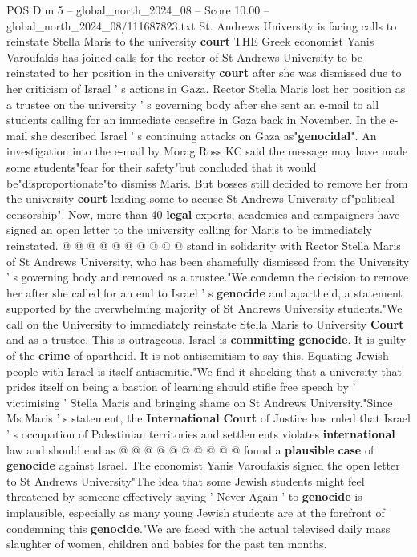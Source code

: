 \begin{textsample}{POS Dim 5 – global\_north\_2024\_08 – Score 10.00 – global\_north\_2024\_08/111687823.txt}  \label{ex:f5_pos_379}
St.
Andrews University is facing calls to reinstate Stella Maris to the university \textbf{court} THE Greek economist Yanis Varoufakis has joined calls for the rector of St Andrews University to be reinstated to her position in the university \textbf{court} after she was dismissed due to her criticism of Israel ' s actions in Gaza.
Rector Stella Maris lost her position as a trustee on the university ' s governing body after she sent an e-mail to all students calling for an immediate ceasefire in Gaza back in November.
In the e-mail she described Israel ' s continuing attacks on Gaza as"\textbf{genocidal}".
An investigation into the e-mail by Morag Ross KC said the message may have made some students"fear for their safety"but concluded that it would be"disproportionate"to dismiss Maris.
But bosses still decided to remove her from the university \textbf{court} leading some to accuse St Andrews University of"political censorship".
Now, more than 40 \textbf{legal} experts, academics and campaigners have signed an open letter to the university calling for Maris to be immediately reinstated. @ @ @ @ @ @ @ @ @ @ stand in solidarity with Rector Stella Maris of St Andrews University, who has been shamefully dismissed from the University ' s governing body and removed as a trustee."We condemn the decision to remove her after she called for an end to Israel ' s \textbf{genocide} and apartheid, a statement supported by the overwhelming majority of St Andrews University students."We call on the University to immediately reinstate Stella Maris to University \textbf{Court} and as a trustee.
This is outrageous.
Israel is \textbf{committing} \textbf{genocide}.
It is guilty of the \textbf{crime} of apartheid.
It is not antisemitism to say this.
Equating Jewish people with Israel is itself antisemitic."We find it shocking that a university that prides itself on being a bastion of learning should stifle free speech by ' victimising ' Stella Maris and bringing shame on St Andrews University."Since Ms Maris ' s statement, the \textbf{International} \textbf{Court} of Justice has ruled that Israel ' s occupation of Palestinian territories and settlements violates \textbf{international} law and should end as @ @ @ @ @ @ @ @ @ @ found a \textbf{plausible} \textbf{case} of \textbf{genocide} against Israel.
The economist Yanis Varoufakis signed the open letter to St Andrews University"The idea that some Jewish students might feel threatened by someone effectively saying ' Never Again ' to \textbf{genocide} is implausible, especially as many young Jewish students are at the forefront of condemning this \textbf{genocide}."We are faced with the actual televised daily mass slaughter of women, children and babies for the past ten months.

\end{textsample}
